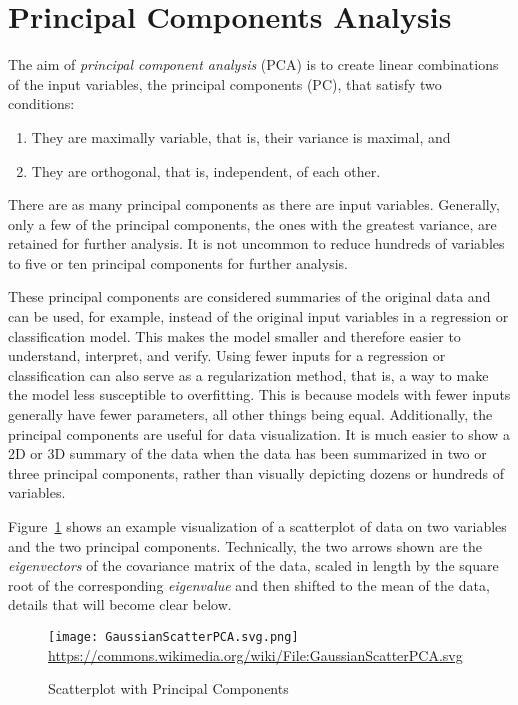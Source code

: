 \section{Principal Components Analysis}

The aim of \emph{principal component analysis} (PCA) is to create linear combinations of the input variables, the principal components (PC), that satisfy two conditions:

\begin{enumerate}
\item They are maximally variable, that is, their variance is maximal, and
\item They are orthogonal, that is, independent, of each other.
\end{enumerate}

There are as many principal components as there are input variables. Generally, only a few of the principal components, the ones with the greatest variance, are retained for further analysis. It is not uncommon to reduce hundreds of variables to five or ten principal components for further analysis.

These principal components are considered summaries of the original data and can be used, for example, instead of the original input variables in a regression or classification model. This makes the model smaller and therefore easier to understand, interpret, and verify. Using fewer inputs for a regression or classification can also serve as a regularization method, that is, a way to make the model less susceptible to overfitting. This is because models with fewer inputs generally have fewer parameters, all other things being equal. Additionally, the principal components are useful for data visualization. It is much easier to show a 2D or 3D summary of the data when the data has been summarized in two or three principal components, rather than visually depicting dozens or hundreds of variables. 

Figure~\ref{fig:pca1} shows an example visualization of a scatterplot of data on two variables and the two principal components. Technically, the two arrows shown are the \emph{eigenvectors} of the covariance matrix of the data, scaled in length by the square root of the corresponding \emph{eigenvalue} and then shifted to the mean of the data, details that will become clear below.

\begin{figure}
\centering
\texttt{[image: GaussianScatterPCA.svg.png]} \\
\scriptsize
\url{https://commons.wikimedia.org/wiki/File:GaussianScatterPCA.svg} \\
\caption{Scatterplot with Principal Components}
\label{fig:pca1}
\end{figure}

